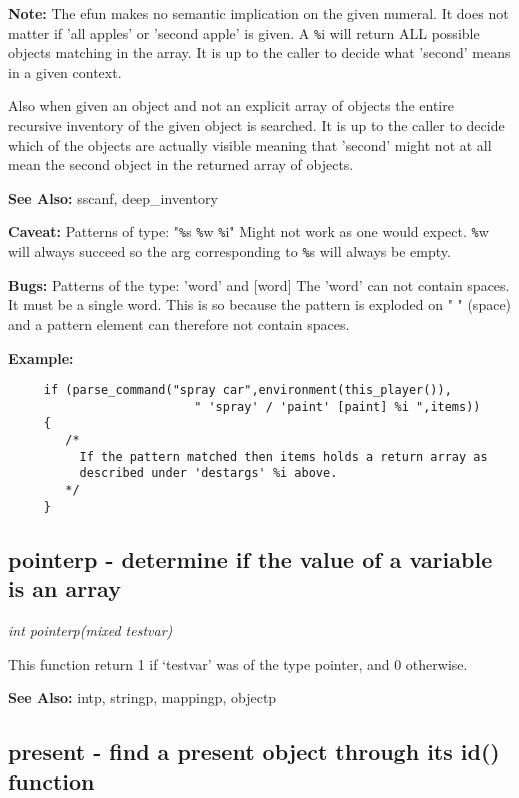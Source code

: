     {\bf Note:}
       The efun makes no semantic implication on the given numeral. It does
       not matter if 'all apples' or 'second apple' is given. A \verb+%+i will
       return ALL possible objects matching in the array. It is up to the
       caller to decide what 'second' means in a given context.

       Also when given an object and not an explicit array of objects the
       entire recursive inventory of the given object is searched. It is up
       to the caller to decide which of the objects are actually visible
       meaning that 'second' might not at all mean the second object in
       the returned array of objects.
            
    {\bf See Also: }    sscanf, deep\_inventory

    {\bf Caveat: }  Patterns of type: "\verb+%+s \verb+%+w \verb+%+i"
    Might not work as one would expect. \verb+%+w will always succeed so the arg
    corresponding to \verb+%+s will always be empty.

    {\bf Bugs:}    Patterns of the type: 'word' and [word]
    The 'word' can not contain spaces. It must be a single word. 
    This is so because the pattern is exploded on " " (space) and a
    pattern element can therefore not contain spaces.

{\bf Example:}
    \begin{verbatim}
     if (parse_command("spray car",environment(this_player()),
                          " 'spray' / 'paint' [paint] %i ",items))  
     {  
        /*
          If the pattern matched then items holds a return array as
          described under 'destargs' %i above.
        */
     }
    \end{verbatim}


\subsection{pointerp - determine if the value of a variable is an array}

    {\em int pointerp(mixed testvar)}

    This function return 1 if `testvar' was of the type pointer,
    and 0 otherwise.

    {\bf See Also:}    intp, stringp, mappingp, objectp



\subsection{present - find a present object through its id() function}


